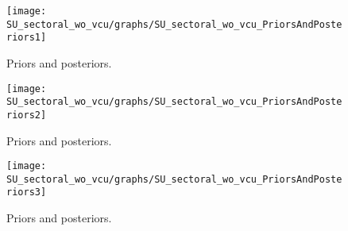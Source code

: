  
\begin{figure}[H]
\centering
\texttt{[image: SU\_sectoral\_wo\_vcu/graphs/SU\_sectoral\_wo\_vcu\_PriorsAndPosteriors1]}
\caption{Priors and posteriors.}\label{Fig:PriorsAndPosteriors:1}
\end{figure}
 
\begin{figure}[H]
\centering
\texttt{[image: SU\_sectoral\_wo\_vcu/graphs/SU\_sectoral\_wo\_vcu\_PriorsAndPosteriors2]}
\caption{Priors and posteriors.}\label{Fig:PriorsAndPosteriors:2}
\end{figure}
 
\begin{figure}[H]
\centering
\texttt{[image: SU\_sectoral\_wo\_vcu/graphs/SU\_sectoral\_wo\_vcu\_PriorsAndPosteriors3]}
\caption{Priors and posteriors.}\label{Fig:PriorsAndPosteriors:3}
\end{figure}
 
